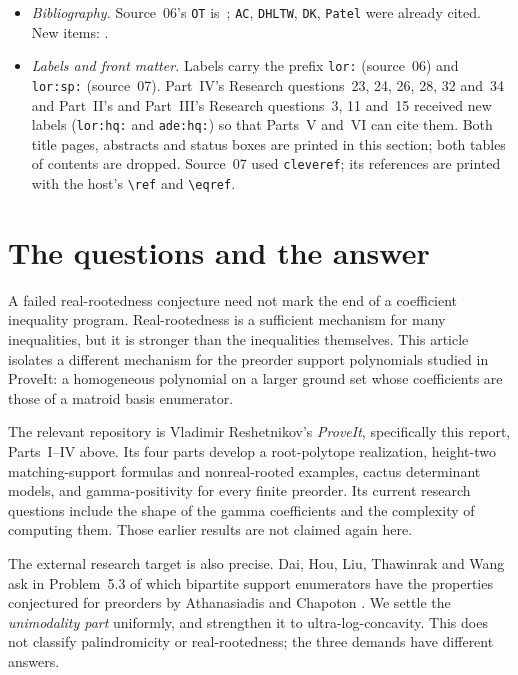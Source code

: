 \documentclass[11pt]{article}
\numberwithin{equation}{section}
\theoremstyle{definition}
\begin{document}
\begin{itemize}[leftmargin=1.4em]
item is printed as this report's~\cite{DHLTW}.
\item \emph{Bibliography.} Source~06's \texttt{OT} is~\cite{OT20}; \texttt{AC},
\texttt{DHLTW}, \texttt{DK}, \texttt{Patel} were already cited. New items:
\cite{RU,BH,ALOV,BP,Mori,Oh,CPV}.
\item \emph{Labels and front matter.} Labels carry the prefix \texttt{lor:}
(source~06) and \texttt{lor:sp:} (source~07). Part~IV's Research
questions~23, 24, 26, 28, 32 and~34 and Part~II's and Part~III's Research
questions~3, 11 and~15 received new labels (\texttt{lor:hq:} and \texttt{ade:hq:})
so that Parts~V and~VI can cite them. Both title pages, abstracts and status
boxes are printed in this section; both tables of contents are dropped.
Source~07 used \texttt{cleveref}; its references are printed with the
host's \verb|\ref| and \verb|\eqref|.
\end{itemize}

\section{The questions and the answer}
\label{lor:sec:intro}
A failed real-rootedness conjecture need not mark the end of a coefficient
inequality program. Real-rootedness is a sufficient mechanism for many
inequalities, but it is stronger than the inequalities themselves. This
article isolates a different mechanism for the preorder support polynomials
studied in ProveIt: a homogeneous polynomial on a larger ground set whose
coefficients are those of a matroid basis enumerator.

The relevant repository is Vladimir Reshetnikov's \emph{ProveIt}, specifically
this report, Parts~I--IV above. Its four parts develop a root-polytope realization,
height-two matching-support formulas and nonreal-rooted examples, cactus
determinant models, and gamma-positivity for every finite preorder. Its
current research questions include the shape of the gamma coefficients and
the complexity of computing them. Those earlier results are not claimed
again here.

The external research target is also precise. Dai, Hou, Liu, Thawinrak and
Wang ask in Problem~5.3 of \cite{DHLTW} which bipartite support enumerators
have the properties conjectured for preorders by Athanasiadis and Chapoton
\cite{AC}. We settle the \emph{unimodality part} uniformly, and strengthen it
to ultra-log-concavity. This does not classify palindromicity or
real-rootedness; the three demands have different answers.
\end{document}
